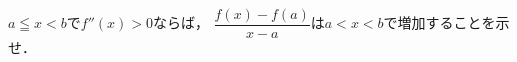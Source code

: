 \documentclass[../../main.tex]{subfiles}
\begin{document}
$a\leqq x<b$で$f''(x)>0$ならば，
$\displaystyle\dfrac{f(x)-f(a)}{x-a}$は$a<x<b$で増加することを示せ．
\end{document}
